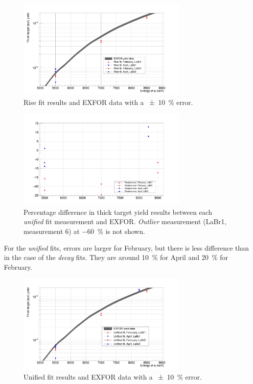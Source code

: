 \documentclass[a4paper,12pt]{report}
\begin{document}
\begin{figure}[H]
	\centering
	\includegraphics[width=0.75\textwidth]{reactions_v_energy_rise.png}
	\caption{Rise fit results and EXFOR data with a \qty{\pm 10}{\percent} error.}
	\label{reactions_v_energy_rise}
\end{figure}

\begin{figure}[H]
	\centering
	\includegraphics[width=0.75\textwidth]{unified_errors_per.png}
	\caption{Percentage difference in thick target yield results between each \textit{unified} fit measurement and EXFOR.
	\textit{Outlier} measurement (LaBr1, measurement 6) at \qty{-60}{\percent} is not shown.}
	\label{unified_errors_per}
\end{figure}

For the \textit{unified} fits, errors are larger for February, but there is less difference than in the case of the \textit{decay} fits.
They are around \qty{10}{\percent} for April and \qty{20}{\percent} for February.

\begin{figure}[H]
	\centering
	\includegraphics[width=0.75\textwidth]{reactions_v_energy_unified.png}
	\caption{Unified fit results and EXFOR data with a \qty{\pm 10}{\percent} error.}
	\label{reactions_v_energy_unified}
\end{figure}
\end{document}
